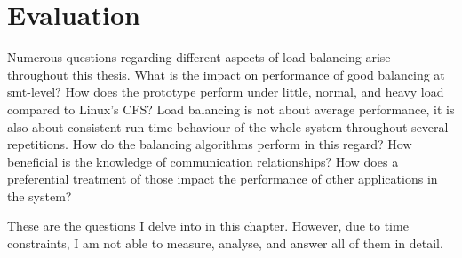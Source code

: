 \chapter{Evaluation}
\label{sec:evaluation}


Numerous questions regarding different aspects of load balancing arise
throughout this thesis.
What is the impact on performance of good balancing at \gls{smt}-level?
How does the prototype perform under little, normal, and heavy load compared to
Linux's CFS?
Load balancing is not about average performance, it is also about consistent
run-time behaviour of the whole system throughout several repetitions. How do
the balancing algorithms perform in this regard?
How beneficial is the knowledge of communication relationships?
How does a preferential treatment of those impact the performance of other
applications in the system?

These are the questions I delve into in this chapter.
However, due to time constraints, I am not able to measure, analyse, and answer
all of them in detail.





\begin{comment}

Is behaviour aware load balancing on L4Re better than behaviour unaware
balancing?
What differences are observable between different SMT assignment schemes?

When compared with Linux \gls{cfs} scheduler, how different is the
performance?

Of interest are performance degradation compared to solo execution, when
executed in parallel with other applications.
Also, the related work suggests that the execution time is much more
deterministic, hence the maximum and minimum execution times are close
together.


\end{comment}


\cleardoublepage

